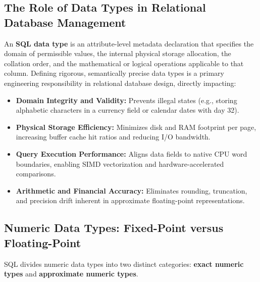 \subsection{The Role of Data Types in Relational Database Management}
An \textbf{SQL data type} is an attribute-level metadata declaration that specifies the domain of permissible values, the internal physical storage allocation, the collation order, and the mathematical or logical operations applicable to that column. Defining rigorous, semantically precise data types is a primary engineering responsibility in relational database design, directly impacting:
\begin{itemize}
    \item \textbf{Domain Integrity and Validity:} Prevents illegal states (e.g., storing alphabetic characters in a currency field or calendar dates with day 32).
    \item \textbf{Physical Storage Efficiency:} Minimizes disk and RAM footprint per page, increasing buffer cache hit ratios and reducing I/O bandwidth.
    \item \textbf{Query Execution Performance:} Aligns data fields to native CPU word boundaries, enabling SIMD vectorization and hardware-accelerated comparisons.
    \item \textbf{Arithmetic and Financial Accuracy:} Eliminates rounding, truncation, and precision drift inherent in approximate floating-point representations.
\end{itemize}

\subsection{Numeric Data Types: Fixed-Point versus Floating-Point}
SQL divides numeric data types into two distinct categories: \textbf{exact numeric types} and \textbf{approximate numeric types}.

